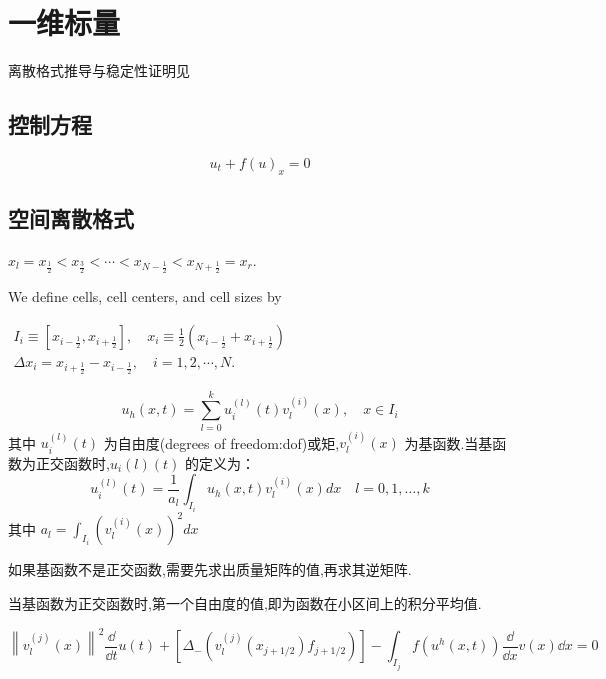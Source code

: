 \documentclass{book}
\begin{document}
\section{一维标量}
离散格式推导与稳定性证明见\cite{RN16}
\subsection{控制方程}
\begin{equation}
    u_t+f(u)_x = 0
\end{equation}
\subsection{空间离散格式}

$x_{l}=x_{\frac{1}{2}}<x_{\frac{3}{2}}<\cdots<x_{N-\frac{1}{2}}<x_{N+\frac{1}{2}}=x_{r} .$

We define cells, cell centers, and cell sizes by

$\begin{array}{l}
        I_{i} \equiv\left[x_{i-\frac{1}{2}}, x_{i+\frac{1}{2}}\right], \quad x_{i} \equiv \frac{1}{2}\left(x_{i-\frac{1}{2}}+x_{i+\frac{1}{2}}\right) \\
        \Delta x_{i}=x_{i+\frac{1}{2}}-x_{i-\frac{1}{2}}, \quad i=1,2, \cdots, N .
    \end{array}$

\begin{equation}
    u_{h}(x, t)=\sum_{l=0}^{k} u_{i}^{(l)}(t) v_{l}^{(i)}(x), \quad x \in I_{i}
\end{equation}
其中 $u_i^{(l)}(t)$ 为自由度(degrees of freedom:dof)或矩,$v_l^{(i)}(x)$ 为基函数.当基函数为正交函数时,$u_i{(l)}(t)$ 的定义为：
\begin{equation}
    u_{i}^{(l)}(t)=\frac{1}{a_{l}} \int_{I_{i}} u_{h}(x, t) v_{l}^{(i)}(x) d x \quad l=0,1, \ldots, k
\end{equation}
其中 $a_{l}=\int_{I_{i}}\left(v_{l}^{(i)}(x)\right)^{2} d x$
\begin{remark}
    如果基函数不是正交函数,需要先求出质量矩阵的值,再求其逆矩阵.
\end{remark}
\begin{remark}
    当基函数为正交函数时,第一个自由度的值,即为函数在小区间上的积分平均值.
\end{remark}
\begin{equation}
    \left\|v_{l}^{(j)}(x)\right\|^{2} \dfrac{\dd}{\dd t} u(t)+\left[\Delta_{-}\left(v_{l}^{(j)}\left(x_{j+1 / 2}\right) f_{j+1 / 2}\right)\right]-\int_{I_{j}} f\left(u^{h}(x, t)\right) \dfrac{\dd}{\dd x} v(x) \dd x=0
\end{equation}
\end{document}
